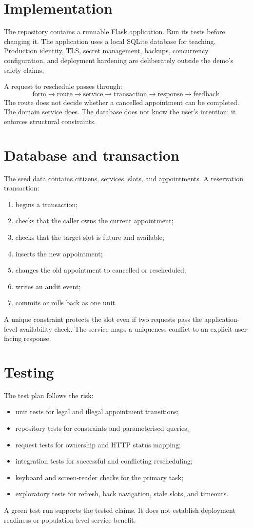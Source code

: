 \section{Implementation}
The repository contains a runnable Flask application. Run its tests before changing it. The application uses a local SQLite database for teaching. Production identity, TLS, secret management, backups, concurrency configuration, and deployment hardening are deliberately outside the demo's safety claims.

A request to reschedule passes through:
\[
\text{form} \rightarrow \text{route} \rightarrow \text{service} \rightarrow \text{transaction} \rightarrow \text{response} \rightarrow \text{feedback}.
\]
The route does not decide whether a cancelled appointment can be completed. The domain service does. The database does not know the user's intention; it enforces structural constraints.

\section{Database and transaction}
The seed data contains citizens, services, slots, and appointments. A reservation transaction:
\begin{enumerate}
\item begins a transaction;
\item checks that the caller owns the current appointment;
\item checks that the target slot is future and available;
\item inserts the new appointment;
\item changes the old appointment to cancelled or rescheduled;
\item writes an audit event;
\item commits or rolls back as one unit.
\end{enumerate}
A unique constraint protects the slot even if two requests pass the application-level availability check. The service maps a uniqueness conflict to an explicit user-facing response.

\section{Testing}
The test plan follows the risk:
\begin{itemize}
\item unit tests for legal and illegal appointment transitions;
\item repository tests for constraints and parameterised queries;
\item request tests for ownership and HTTP status mapping;
\item integration tests for successful and conflicting rescheduling;
\item keyboard and screen-reader checks for the primary task;
\item exploratory tests for refresh, back navigation, stale slots, and timeouts.
\end{itemize}
A green test run supports the tested claims. It does not establish deployment readiness or population-level service benefit.

